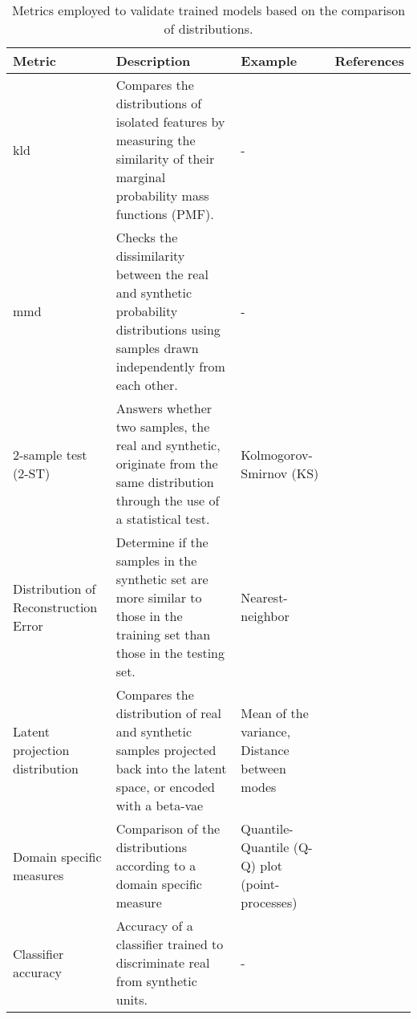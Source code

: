         \begin{table}[H]
        \footnotesize
            \caption{Metrics employed to validate trained models based on the comparison of distributions.\label{tab:distributions}} 
            \begin{tabularx}{\textwidth}{@{} p{} X p{} p{} @{}}\toprule
        
                Metric & Description & Example & References\\\midrule
                
                \gls{kld} & Compares the distributions of isolated features by measuring the similarity of their marginal probability mass functions (PMF). & - &
                \cite{Goncalves2020}\\
                
                \gls{mmd} & 
                Checks the dissimilarity between the real and synthetic probability distributions using samples drawn independently from each other. & - &
                \cite{esteban2017real}\\
                
                2-sample test (2-ST) & Answers whether two samples, the real and synthetic, originate from the same distribution through the use of a statistical test. & 
                Kolmogorov-Smirnov (KS) & 
                \cite{Fisher2019,baowaly_2019_IEEE,baowaly_2019_jamia}\\
                
                Distribution of Reconstruction Error & 
                Determine if the samples in the synthetic set are more similar to those in the training set than those in the testing set. & Nearest-neighbor &
                \cite{esteban2017real}\\
                
                Latent projection distribution & 
                Compares the distribution of real and synthetic samples projected back into the latent space, or encoded with a \gls{beta-vae} & Mean of the variance, Distance between modes & \cite{Zhang2020} \\
                
                Domain specific measures & Comparison of the distributions according to a domain specific measure & Quantile-Quantile (Q-Q) plot (point-processes) & \cite{Xiao2017-lh}\\
                
                Classifier accuracy & Accuracy of a classifier trained to discriminate real from synthetic units. & - & \cite{Fisher2019,walsh2020generating}\\\bottomrule
        
            \end{tabularx}
        \end{table}

